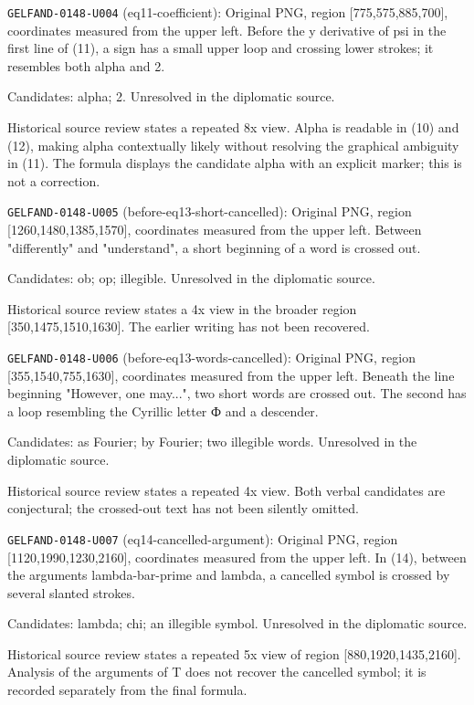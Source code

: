 \noindent\texttt{GELFAND-0148-U004} (eq11-coefficient): Original PNG, region [775,575,885,700], coordinates measured from the upper left. Before the y derivative of psi in the first line of (11), a sign has a small upper loop and crossing lower strokes; it resembles both alpha and 2.\par
Candidates: alpha; 2. Unresolved in the diplomatic source.\par
Historical source review states a repeated 8x view. Alpha is readable in (10) and (12), making alpha contextually likely without resolving the graphical ambiguity in (11). The formula displays the candidate alpha with an explicit marker; this is not a correction.\par

\noindent\texttt{GELFAND-0148-U005} (before-eq13-short-cancelled): Original PNG, region [1260,1480,1385,1570], coordinates measured from the upper left. Between "differently" and "understand", a short beginning of a word is crossed out.\par
Candidates: ob; op; illegible. Unresolved in the diplomatic source.\par
Historical source review states a 4x view in the broader region [350,1475,1510,1630]. The earlier writing has not been recovered.\par

\noindent\texttt{GELFAND-0148-U006} (before-eq13-words-cancelled): Original PNG, region [355,1540,755,1630], coordinates measured from the upper left. Beneath the line beginning "However, one may...", two short words are crossed out. The second has a loop resembling the Cyrillic letter Ф and a descender.\par
Candidates: as Fourier; by Fourier; two illegible words. Unresolved in the diplomatic source.\par
Historical source review states a repeated 4x view. Both verbal candidates are conjectural; the crossed-out text has not been silently omitted.\par

\noindent\texttt{GELFAND-0148-U007} (eq14-cancelled-argument): Original PNG, region [1120,1990,1230,2160], coordinates measured from the upper left. In (14), between the arguments lambda-bar-prime and lambda, a cancelled symbol is crossed by several slanted strokes.\par
Candidates: lambda; chi; an illegible symbol. Unresolved in the diplomatic source.\par
Historical source review states a repeated 5x view of region [880,1920,1435,2160]. Analysis of the arguments of T does not recover the cancelled symbol; it is recorded separately from the final formula.\par

